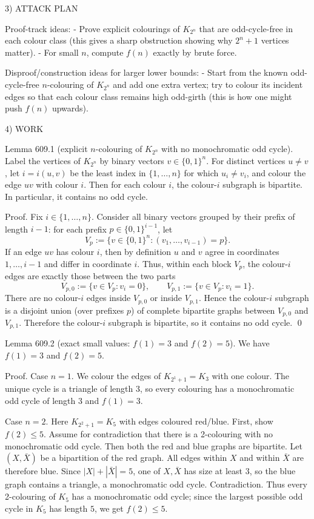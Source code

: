 3) ATTACK PLAN

Proof-track ideas:
- Prove explicit colourings of $K_{2^n}$ that are odd-cycle-free in each colour class (this gives a sharp obstruction showing why $2^n+1$ vertices matter).
- For small $n$, compute $f(n)$ exactly by brute force.

Disproof/construction ideas for larger lower bounds:
- Start from the known odd-cycle-free $n$-colouring of $K_{2^n}$ and add one extra vertex; try to colour its incident edges so that each colour class remains high odd-girth (this is how one might push $f(n)$ upwards).

4) WORK

Lemma 609.1 (explicit $n$-colouring of $K_{2^n}$ with no monochromatic odd cycle).
Label the vertices of $K_{2^n}$ by binary vectors $v\in\{0,1\}^n$.
For distinct vertices $u\neq v$, let $i=i(u,v)$ be the least index in $\{1,\dots,n\}$ for which $u_i\neq v_i$, and colour the edge $uv$ with colour $i$.
Then for each colour $i$, the colour-$i$ subgraph is bipartite. In particular, it contains no odd cycle.

Proof.
Fix $i\in\{1,\dots,n\}$.
Consider all binary vectors grouped by their prefix of length $i-1$:
for each prefix $p\in\{0,1\}^{i-1}$, let
\[
V_p := \{ v\in\{0,1\}^n : (v_1,\dots,v_{i-1})=p\}.
\]
If an edge $uv$ has colour $i$, then by definition $u$ and $v$ agree in coordinates $1,\dots,i-1$ and differ in coordinate $i$.
Thus, within each block $V_p$, the colour-$i$ edges are exactly those between the two parts
\[
V_{p,0}:=\{v\in V_p: v_i=0\},\qquad V_{p,1}:=\{v\in V_p: v_i=1\}.
\]
There are no colour-$i$ edges inside $V_{p,0}$ or inside $V_{p,1}$.
Hence the colour-$i$ subgraph is a disjoint union (over prefixes $p$) of complete bipartite graphs between $V_{p,0}$ and $V_{p,1}$.
Therefore the colour-$i$ subgraph is bipartite, so it contains no odd cycle.
\qed

Lemma 609.2 (exact small values: $f(1)=3$ and $f(2)=5$).
We have $f(1)=3$ and $f(2)=5$.

Proof.
Case $n=1$.
We colour the edges of $K_{2^1+1}=K_3$ with one colour. The unique cycle is a triangle of length $3$, so every colouring has a monochromatic odd cycle of length $3$ and $f(1)=3$.

Case $n=2$.
Here $K_{2^2+1}=K_5$ with edges coloured red/blue.
First, show $f(2)\le 5$.
Assume for contradiction that there is a 2-colouring with no monochromatic odd cycle.
Then both the red and blue graphs are bipartite.
Let $(X,\bar X)$ be a bipartition of the red graph.
All edges within $X$ and within $\bar X$ are therefore blue.
Since $|X|+|\bar X|=5$, one of $X,\bar X$ has size at least $3$, so the blue graph contains a triangle, a monochromatic odd cycle.
Contradiction.
Thus every 2-colouring of $K_5$ has a monochromatic odd cycle; since the largest possible odd cycle in $K_5$ has length $5$, we get $f(2)\le 5$.

